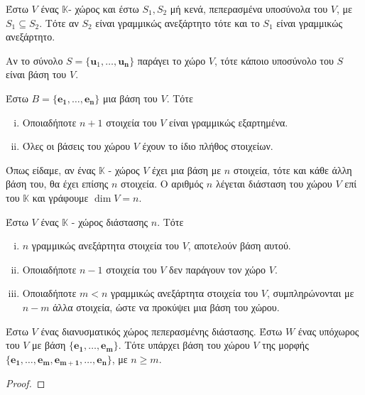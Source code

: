 \begin{cor}
  Έστω $V$ ένας $ \mathbb{K} $- χώρος και έστω $ S_{1}, S_{2} $ μή κενά, 
  πεπερασμένα υποσύνολα του $V$, με $ S_{1} \subseteq S_{2} $. Τότε αν 
  $ S_{2} $ είναι γραμμικώς ανεξάρτητο τότε και το $ S_{1} $ είναι γραμμικώς 
  ανεξάρτητο.
\end{cor}

\begin{prop}
  Αν το σύνολο $ S = \{ \mathbf{u}_{1}, \ldots, \mathbf{u_{n}} \} $ παράγει 
  το χώρο $V$, τότε κάποιο υποσύνολο του $S$ είναι βάση του $V$.
\end{prop}

\begin{thm}
  Έστω $ B = \{ \mathbf{e_{1}}, \ldots, \mathbf{e_{n}} \} $ μια βάση του $V$. 
  Τότε 
  \begin{enumerate}[i)]
    \item Οποιαδήποτε $ n+1 $ στοιχεία του $V$ είναι γραμμικώς εξαρτημένα.
    \item Όλες οι βάσεις του χώρου $V$ έχουν το ίδιο πλήθος στοιχείων.
  \end{enumerate}
\end{thm}

\begin{dfn}
  Όπως είδαμε, αν ένας $ \mathbb{K} $ - χώρος $V$ έχει μια βάση με 
  $ n $ στοιχεία, τότε και κάθε άλλη βάση του, θα έχει επίσης $n$ στοιχεία. 
  Ο αριθμός $n$ λέγεται \textcolor{Col2}{διάσταση} του χώρου $V$ επί του 
  $ \mathbb{K} $ και γράφουμε $ \dim V = n $.
\end{dfn}

\begin{prop}
\item {}
  Έστω $V$ ένας $ \mathbb{K} $ - χώρος διάστασης $n$. Τότε
  \begin{enumerate}[i)]
    \item $n$ γραμμικώς ανεξάρτητα στοιχεία του $V$, αποτελούν βάση αυτού.
    \item Οποιαδήποτε $ n-1 $ στοιχεία του $V$ δεν παράγουν τον χώρο $V$.
    \item Οποιαδήποτε $ m < n $ γραμμικώς ανεξάρτητα στοιχεία του $V$, 
      συμπληρώνονται με $ n-m $ άλλα στοιχεία, ώστε να προκύψει μια 
      βάση του χώρου.
  \end{enumerate}
\end{prop}

\begin{prop}
  Έστω $V$ ένας διανυσματικός χώρος πεπερασμένης διάστασης. Έστω $ W $ ένας 
  υπόχωρος του $V$ με βάση $ \{ \mathbf{e_{1}}, \ldots, \mathbf{e_{m}} \} $. 
  Τότε υπάρχει βάση του χώρου $ V $ της μορφής 
  $ \{ \mathbf{e_{1}}, \ldots, \mathbf{e_{m}}, \mathbf{e_{m+1}}, \ldots, 
  \mathbf{e_{n}} \} $, με $ n \geq m $.
\end{prop}
\begin{proof}

\end{proof}

